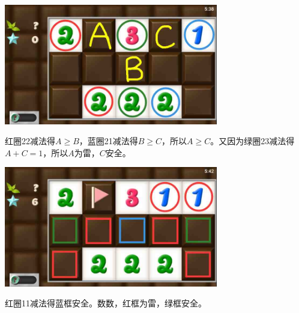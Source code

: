 \subsection{} %
\begin{center}
    \includegraphics[width=0.7\textwidth]{puzzlelow/63-1.jpg}
\end{center}
红圈22减法得$A\ge B$，蓝圈21减法得$B\ge C$，所以$A\ge C$。又因为绿圈23减法得$A+C=1$，所以$A$为雷，$C$安全。
\begin{center}
    \includegraphics[width=0.7\textwidth]{puzzlelow/63-2.jpg}
\end{center}
红圈11减法得蓝框安全。数数，红框为雷，绿框安全。

